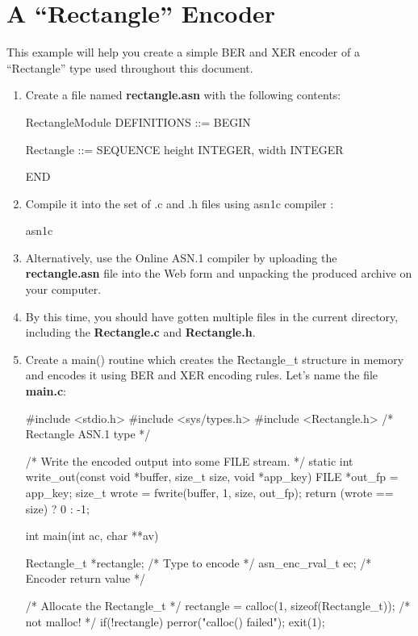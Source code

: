 \documentclass[english,oneside,12pt]{book}
\begin{document}
\section{A “Rectangle” Encoder}

This example will help you create a simple BER and XER encoder of
a ``Rectangle'' type used throughout this document.
\begin{enumerate}
\item Create a file named \textbf{rectangle.asn} with the following contents:

\begin{asn}
RectangleModule DEFINITIONS ::= BEGIN

Rectangle ::= SEQUENCE {
    height  INTEGER,
    width   INTEGER
}

END
\end{asn}
\item Compile it into the set of .c and .h files using asn1c compiler \cite{ASN1C}:

\begin{bash}
asn1c %
\end{bash}
\item Alternatively, use the Online ASN.1 compiler \cite{AONL} by uploading
the \textbf{rectangle.asn} file into the Web form and unpacking the
produced archive on your computer.
\item By this time, you should have gotten multiple files in the current
directory, including the \textbf{Rectangle.c} and \textbf{Rectangle.h}.
\item Create a main() routine which creates the Rectangle\_t structure in
memory and encodes it using BER and XER encoding rules. Let's name
the file \textbf{main.c}:

\begin{codesample}[basicstyle=\scriptsize\listingfont]
#include <stdio.h>
#include <sys/types.h>
#include <Rectangle.h>   /* Rectangle ASN.1 type  */

/* Write the encoded output into some FILE stream. */
static int write_out(const void *buffer, size_t size, void *app_key) {
    FILE *out_fp = app_key;
    size_t wrote = fwrite(buffer, 1, size, out_fp);
    return (wrote == size) ? 0 : -1;
}
 
int main(int ac, char **av) {
    Rectangle_t *rectangle; /* Type to encode        */
    asn_enc_rval_t ec;      /* Encoder return value  */

    /* Allocate the Rectangle_t */
    rectangle = calloc(1, sizeof(Rectangle_t)); /* not malloc! */
    if(!rectangle) {
        perror("calloc() failed");
        exit(1);
    }

}
\end{codesample}
\end{enumerate}
\end{document}
